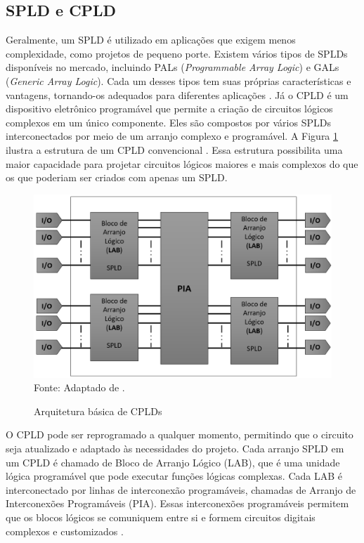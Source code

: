 \subsection{SPLD e CPLD}
Geralmente, um SPLD é utilizado em aplicações que exigem menos complexidade, como projetos de pequeno porte. Existem vários tipos de SPLDs disponíveis no mercado, incluindo PALs (\textit{Programmable Array Logic}) e GALs (\textit{Generic Array Logic}). Cada um desses tipos tem suas próprias características e vantagens, tornando-os adequados para diferentes aplicações \cite{floyd2009sistemas}. Já o CPLD é um dispositivo eletrônico programável que permite a criação de circuitos lógicos complexos em um único componente. Eles são compostos por vários SPLDs interconectados por meio de um arranjo complexo e programável. A Figura \ref{fig:Arqui_CPLD} ilustra a estrutura de um CPLD convencional \cite{pedroni2010eletronica}. Essa estrutura possibilita uma maior capacidade para projetar circuitos lógicos maiores e mais complexos do que os que poderiam ser criados com apenas um SPLD.

\begin{figure}[!htb]
    \centering
    \caption{Arquitetura básica de CPLDs}
    \includegraphics[scale=0.5]{figuras/ARQ_CPLD2.png}\\
    {\footnotesize Fonte: Adaptado de \cite{floyd2009sistemas}.}
    \label{fig:Arqui_CPLD}
\end{figure}

O CPLD pode ser reprogramado a qualquer momento, permitindo que o circuito seja atualizado e adaptado às necessidades do projeto. Cada arranjo SPLD em um CPLD é chamado de Bloco de Arranjo Lógico (LAB), que é uma unidade lógica programável que pode executar funções lógicas complexas. Cada LAB é interconectado por linhas de interconexão programáveis, chamadas de Arranjo de Interconexões Programáveis (PIA). Essas interconexões programáveis permitem que os blocos lógicos se comuniquem entre si e formem circuitos digitais complexos e customizados \cite{floyd2009sistemas}. 

